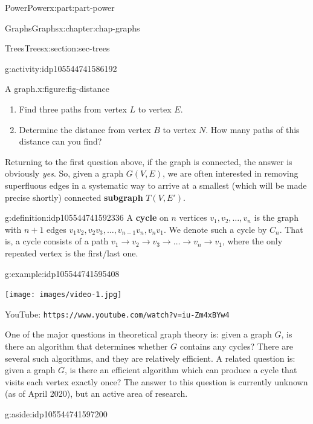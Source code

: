 \documentclass[oneside,10pt,]{book}
\newcommand{\mono}[1]{\texttt{#1}}
\newcommand{\terminology}[1]{\textbf{#1}}
\numberwithin{equation}{section}
\newlength{\qrsize}
\newlength{\previewwidth}
\begin{document}
\begin{partptx}{Power}{}{Power}{}{}{x:part:part-power}
\begin{chapterptx}{Graphs}{}{Graphs}{}{}{x:chapter:chap-graphs}
\begin{sectionptx}{Trees}{}{Trees}{}{}{x:section:sec-trees}
\begin{activity}{}{g:activity:idp105544741586192}
\begin{figureptx}{A graph.}{x:figure:fig-distance}{}
\begin{image}{0.25}{0.5}{0.25}
\end{image}%
\tcblower
\end{figureptx}%
%
\begin{enumerate}
\item{}Find three paths from vertex \(L\) to vertex \(E\).%
\item{}Determine the distance from vertex \(B\) to vertex \(N\). How many paths of this distance can you find?%
\end{enumerate}
\end{activity}%
Returning to the first question above, if the graph is connected, the answer is obviously \emph{yes}. So, given a graph \(G(V,E)\), we are often interested in removing superfluous edges in a systematic way to arrive at a smallest (which will be made precise shortly) connected \terminology{subgraph} \(T(V,E')\).%
\begin{definition}{}{g:definition:idp105544741592336}%
A \terminology{cycle} on \(n\) vertices \(v_1, v_2, \ldots, v_n\) is the graph with \(n+1\) edges \(v_1 v_2, v_2 v_3, \ldots, v_{n-1} v_n, v_n v_1\). We denote such a cycle by \(C_n\). That is, a cycle consists of a path \(v_1 \to v_2 \to v_3 \to \ldots \to v_n \to v_1\), where the only repeated vertex is the first\slash{}last one.%
\end{definition}
\begin{example}{}{g:example:idp105544741595408}%
\setlength{\qrsize}{9em}
\setlength{\previewwidth}{\linewidth}
\addtolength{\previewwidth}{-\qrsize}
\begin{tcbraster}[raster columns=2, raster column skip=1pt, raster halign=center, raster force size=false, raster left skip=0pt, raster right skip=0pt]%
\begin{tcolorbox}[previewstyle, width=\previewwidth]%
\texttt{[image: images/video-1.jpg]}%
\end{tcolorbox}%
\begin{tcolorbox}[qrstyle]%
{\hypersetup{urlcolor=black}}%
\end{tcolorbox}%
\begin{tcolorbox}[captionstyle]%
\small YouTube: \mono{https://www.youtube.com/watch?v=iu-Zm4xBYw4}\end{tcolorbox}%
\end{tcbraster}%
\end{example}
One of the major questions in theoretical graph theory is: given a graph \(G\), is there an algorithm that determines whether \(G\) contains any cycles? There are several such algorithms, and they are relatively efficient. A related question is: given a graph \(G\), is there an efficient algorithm which can produce a cycle that visits each vertex exactly once? The answer to this question is currently unknown (as of April 2020), but an active area of research. \begin{aside}{}{g:aside:idp105544741597200}%

\end{aside}
\end{sectionptx}
\end{chapterptx}
\end{partptx}
\end{document}
